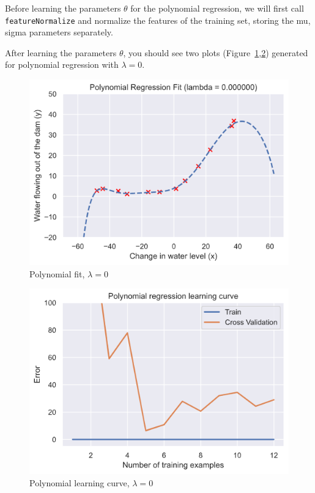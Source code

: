 \documentclass[12pt]{article}
\begin{document}
Before learning the parameters $\theta$ for the polynomial regression, we will first call \texttt{featureNormalize} and normalize the features of the training set, storing the mu, sigma parameters separately. 

After learning the parameters $\theta$, you should see two plots (Figure~\ref{fig:polynomialfit},\ref{fig:polylearningcurve}) generated for polynomial regression with $\lambda = 0$.

\begin{figure}[h!]
  \centering
  \includegraphics[scale=0.6]{polynomialfit.png}
  \caption{Polynomial fit, $\lambda = 0$}
  \label{fig:polynomialfit}
\end{figure}

\begin{figure}[h!]
  \centering
  \includegraphics[scale=0.6]{polylearningcurve.png}
  \caption{Polynomial learning curve, $\lambda = 0$}
  \label{fig:polylearningcurve}
\end{figure}
\end{document}
